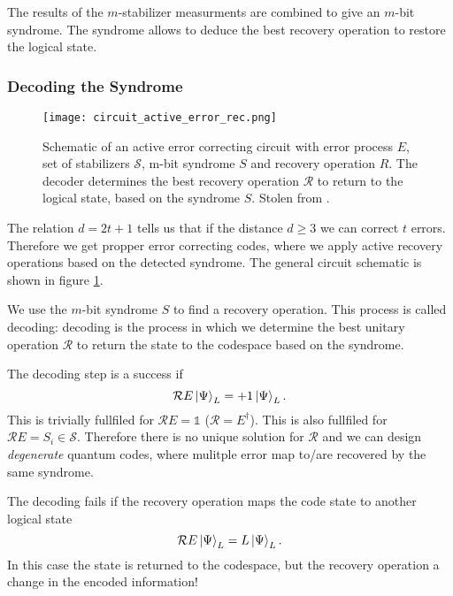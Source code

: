 The results of the $m$-stabilizer measurments are combined to give an $m$-bit syndrome.
The syndrome allows to deduce the best recovery operation to restore the logical state.


\subsubsection{Decoding the Syndrome}
\begin{figure}[h]
    \begin{center}
        \texttt{[image: circuit\_active\_error\_rec.png]}
    \end{center}
    \caption{
    Schematic of an active error correcting circuit with error process $E$, set of stabilizers $\mathcal{S}$, m-bit syndrome $S$ and recovery operation $R$.
    The decoder determines the best recovery operation $\mathcal{R}$ to return to the logical state, based on the syndrome $S$.
    Stolen from \cite{QECintro}.
    }
    \label{fig:basic.qc.qec_circuit}
\end{figure}
The relation $d = 2t+1$ tells us that if the distance $d\ge 3$ we can correct $t$ errors.
Therefore we get propper error correcting codes, where we apply active recovery operations based on the detected syndrome.
The general circuit schematic is shown in figure \ref{fig:basic.qc.qec_circuit}. \cite{QECintro}

We use the $m$-bit syndrome $S$ to find a recovery operation. 
This process is called decoding: 
decoding is the process in which we determine the best unitary operation $\mathcal{R}$ to return the state to the codespace based on the syndrome. \cite{QECintro}

The decoding step is a success if 
\begin{equation}
    \mathcal{R}E \ket{\Psi}_L = +1 \ket{\Psi}_L.
\end{equation}
This is trivially fullfiled for $\mathcal{R}E=\mathds{1}$ ($\mathcal{R}=E^\dagger$). 
This is also fullfiled for $\mathcal{R}E=S_i \in \mathcal{S}$.
Therefore there is no unique solution for $\mathcal{R}$ and we can design \textit{degenerate} quantum codes,
where mulitple error map to/are recovered by the same syndrome. \cite{QECintro}

The decoding fails if the recovery operation maps the code state to another logical state
\begin{equation}
    \mathcal{R}E \ket{\Psi}_L = L\ket{\Psi}_L.
\end{equation}
In this case the state is returned to the codespace, 
but the recovery operation a change in the encoded information! \cite{QECintro}


